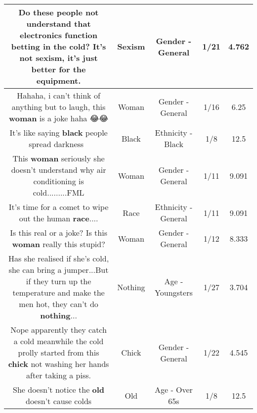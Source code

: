 \documentclass[11pt]{article}
\newlength\mylength
\begin{document}
\begin{center}
\begin{longtable}{|C{.65\mylength}|C{.30\mylength}|C{.12\mylength}|C{.12\mylength}|C{.12\mylength}|}
  \small Do these people not understand that electronics function betting in the cold? It's not \textbf{sexism}, it's just better for the equipment.\normalsize   & Sexism & Gender - General & 1/21 & 4.762 \\  \hline
  \small Hahaha, i can't  think of anything but to laugh, this \textbf{woman} is a joke haha 😂😂\normalsize   & Woman & Gender - General & 1/16 & 6.25 \\  \hline
  \small It's like saying \textbf{black} people spread darkness 🤣\normalsize   & Black & Ethnicity - Black & 1/8 & 12.5 \\  \hline
  \small This \textbf{woman} seriously she doesn't understand why air conditioning is cold.........FML\normalsize   & Woman & Gender - General & 1/11 & 9.091 \\  \hline
  \small It's time for a comet to wipe out the human \textbf{race}....\normalsize   & Race & Ethnicity - General & 1/11 & 9.091 \\  \hline
  \small Is this real or a joke? Is this \textbf{woman} really this stupid?\normalsize   & Woman & Gender - General & 1/12 & 8.333 \\  \hline
  \small Has she realised if she's cold, she can bring a jumper...But if they turn up the temperature and make the men hot, they can't do \textbf{nothing}...\normalsize   & Nothing & Age - Youngsters & 1/27 & 3.704 \\  \hline
  \small Nope apparently they catch a cold meanwhile the cold prolly started from this \textbf{chick} not washing her hands after taking a piss.\normalsize   & Chick & Gender - General & 1/22 & 4.545 \\  \hline
  \small She doesn't notice the \textbf{old} doesn't cause colds\normalsize   & Old & Age - Over 65s & 1/8 & 12.5 \\  \hline

\end{longtable}
\end{center}
\end{document}
